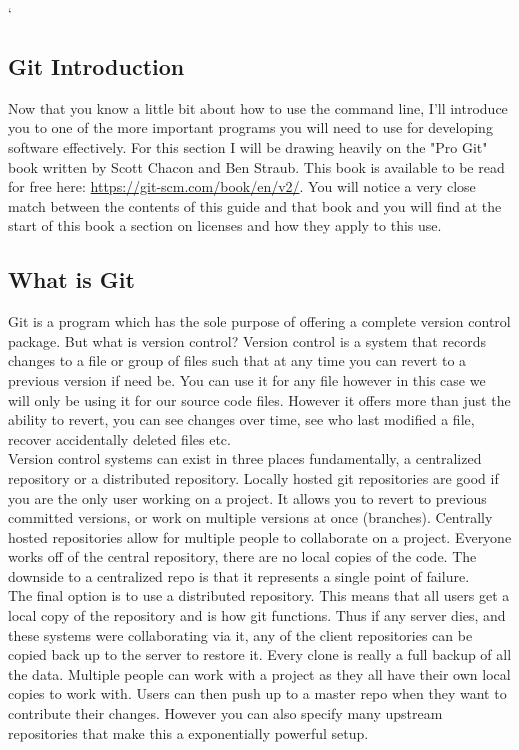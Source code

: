`\documentclass[a4paper,11pt]{report}
\begin{document}
\begin{description}
					\section{Git Introduction}
						Now that you know a little bit about how to use the command line, I'll introduce you to one of the more important programs you will need to use for developing software effectively.
						For this section I will be drawing heavily on the "Pro Git" book written by Scott Chacon and Ben Straub.
						This book is available to be read for free here: \url{https://git-scm.com/book/en/v2/}.
						You will notice a very close match between the contents of this guide and that book and you will find at the start of this book a section on licenses and how they apply to this use.

						\subsection{What is Git}
							Git is a program which has the sole purpose of offering a complete version control package.
							But what is version control? Version control is a system that records changes to a file or group of files such that at any time you can revert to a previous version if need be.
							You can use it for any file however in this case we will only be using it for our source code files.
							However it offers more than just the ability to revert, you can see changes over time, see who last modified a file, recover accidentally deleted files etc.\\

							Version control systems can exist in three places fundamentally, a centralized repository or a distributed repository.
							Locally hosted git repositories are good if you are the only user working on a project.
							It allows you to revert to previous committed versions, or work on multiple versions at once (branches).
							Centrally hosted repositories allow for multiple people to collaborate on a project.
							Everyone works off of the central repository, there are no local copies of the code.
							The downside to a centralized repo is that it represents a single point of failure.\\

							The final option is to use a distributed repository.
							This means that all users get a local copy of the repository and is how git functions.
							Thus if any server dies, and these systems were collaborating via it, any of the client repositories can be copied back up to the server to restore it.
							Every clone is really a full backup of all the data.
							Multiple people can work with a project as they all have their own local copies to work with.
							Users can then push up to a master repo when they want to contribute their changes.
							However you can also specify many upstream repositories that make this a exponentially powerful setup.


\end{description}
\end{document}
